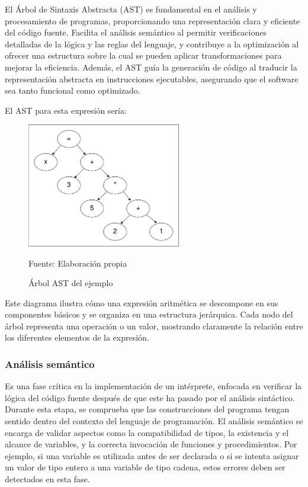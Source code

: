 El Árbol de Sintaxis Abstracta (AST) es fundamental en el análisis y procesamiento de programas, proporcionando una representación clara y eficiente del código fuente. Facilita el análisis semántico al permitir verificaciones detalladas de la lógica y las reglas del lenguaje, y contribuye a la optimización al ofrecer una estructura sobre la cual se pueden aplicar transformaciones para mejorar la eficiencia. Además, el AST guía la generación de código al traducir la representación abstracta en instrucciones ejecutables, asegurando que el software sea tanto funcional como optimizado.

El AST para esta expresión sería:

\begin{figure}[!h]
  \centering
  \includegraphics[width=0.6\textwidth]{images/ast_ejemplo.png}
  \caption{Árbol AST del ejemplo}
  \centering Fuente: Elaboración propia
  \label{fig:ast_ejemplo}
\end{figure}

Este diagrama ilustra cómo una expresión aritmética se descompone en sus componentes básicos y se organiza en una estructura jerárquica. Cada nodo del árbol representa una operación o un valor, mostrando claramente la relación entre los diferentes elementos de la expresión.

\subsubsection{Análisis semántico}
Es una fase crítica en la implementación de un intérprete, enfocada en verificar la lógica del código fuente después de que este ha pasado por el análisis sintáctico. Durante esta etapa, se comprueba que las construcciones del programa tengan sentido dentro del contexto del lenguaje de programación. El análisis semántico se encarga de validar aspectos como la compatibilidad de tipos, la existencia y el alcance de variables, y la correcta invocación de funciones y procedimientos. Por ejemplo, si una variable es utilizada antes de ser declarada o si se intenta asignar un valor de tipo entero a una variable de tipo cadena, estos errores deben ser detectados en esta fase.

